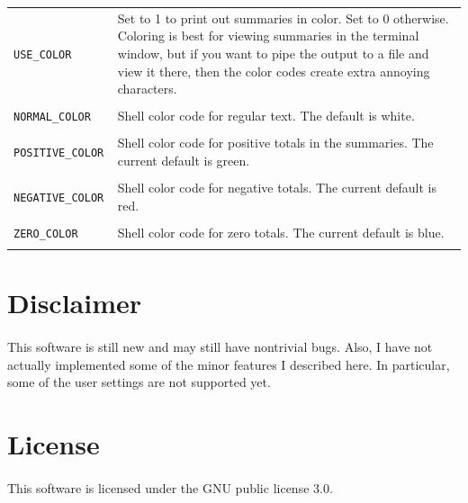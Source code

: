 \documentclass{article}
\begin{document}
\begin{flushleft}
\begin{center}
\begin{tabular}{lp{11cm}}
{\tt USE\_COLOR} & Set to 1 to print out summaries in color. Set to 0 otherwise. Coloring is best for viewing summaries
in the terminal window, but if you want to pipe the output to a file and view it there, then the color codes create extra 
annoying characters. \\ \\

{\tt NORMAL\_COLOR } & Shell color code for regular text. The default is white. \\ \\

{\tt POSITIVE\_COLOR } & Shell color code for positive totals in the summaries. The current default is green. \\ \\

{\tt NEGATIVE\_COLOR } & Shell color code for negative totals. The current default is red. \\ \\

{\tt ZERO\_COLOR } & Shell color code for zero totals. The current default is blue. \\ \\


\end{tabular}
\end{center}



\section{Disclaimer}

\paragraph{} This software is still new and may still have nontrivial bugs. Also, I have not actually implemented some of the minor features I described here. In particular, some of the user settings are not supported yet.


\section{License}

\paragraph{} This software is licensed under the GNU public license 3.0. 





\end{flushleft}
% 
%
\end{document}
